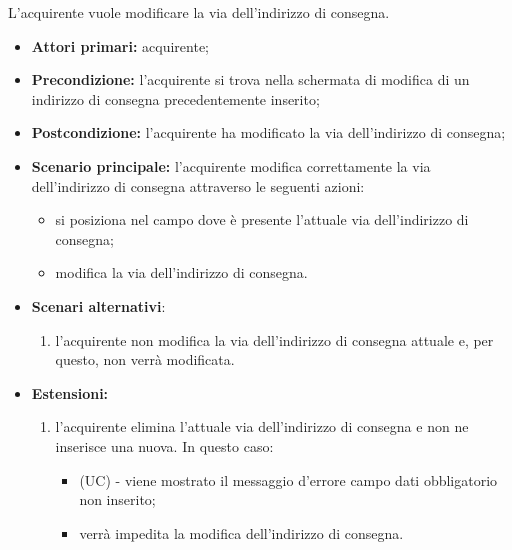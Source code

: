 L'acquirente vuole modificare la via dell'indirizzo di consegna.
\begin{itemize}
    \item \textbf{Attori primari:} acquirente;
    \item \textbf{Precondizione:} l'acquirente si trova nella schermata di modifica di un indirizzo di consegna precedentemente inserito;
    \item \textbf{Postcondizione:} l'acquirente ha modificato la via dell'indirizzo di consegna;
    \item \textbf{Scenario principale:} l'acquirente modifica correttamente la via dell'indirizzo di consegna attraverso le seguenti azioni:
    \begin{itemize}
        \item si posiziona nel campo dove è presente l'attuale via dell'indirizzo di consegna;
        \item modifica la via dell'indirizzo di consegna.
    \end{itemize}
    \item \textbf{Scenari alternativi}:
    \begin{enumerate}[label=\lett]
        \item l'acquirente non modifica la via dell'indirizzo di consegna attuale e, per questo, non verrà modificata.
    \end{enumerate}
    \item \textbf{Estensioni:}
    \begin{enumerate}[label=\lett]
        \item l'acquirente elimina l'attuale via dell'indirizzo di consegna e non ne inserisce una nuova. In questo caso:
        \begin{itemize}
            \item (UC) - viene mostrato il messaggio d'errore campo dati obbligatorio non inserito;
            \item verrà impedita la modifica dell'indirizzo di consegna.
        \end{itemize}
    \end{enumerate}
\end{itemize}

